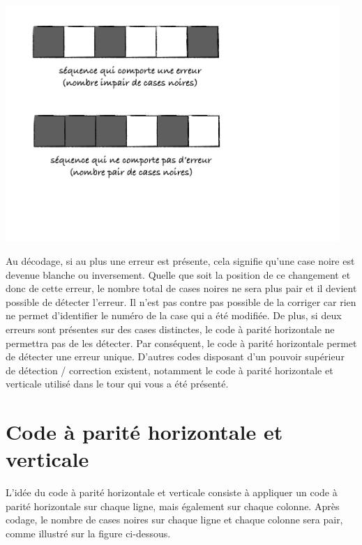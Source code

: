 \documentclass[frenchb,11pt]{article}
\begin{document}
\begin{minipage}{0.40\linewidth}
\includegraphics[width=0.95\textwidth]{error-seq.pdf}
\end{minipage}
\begin{minipage}{0.55\linewidth}
Au décodage, si au plus une erreur est présente, cela signifie qu'une case noire est devenue blanche ou inversement.
Quelle que soit la position de ce changement et donc de cette erreur, le nombre total de cases noires ne sera plus pair et il devient possible de détecter l'erreur.
Il n'est pas contre pas possible de la corriger car rien ne permet d'identifier le numéro de la case qui a été modifiée.
De plus, si deux erreurs sont présentes sur des cases distinctes, le code à parité horizontale ne permettra pas de les détecter.
Par conséquent, le code à parité horizontale permet de détecter une erreur unique.
D'autres codes disposant d'un pouvoir supérieur de détection / correction existent, notamment le code à parité horizontale et verticale utilisé dans le tour qui vous a été présenté.
\end{minipage}

\section*{Code à parité horizontale et verticale}

L'idée du code à parité horizontale et verticale consiste à appliquer un code à parité horizontale sur chaque ligne, mais également sur chaque colonne.
Après codage, le nombre de cases noires sur chaque ligne et chaque colonne sera pair, comme illustré sur la figure ci-dessous.
\end{document}
